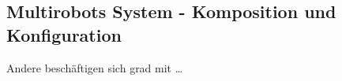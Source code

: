 \subsection{Multirobots System - Komposition und Konfiguration}
\label{sec:relatedwork-multirobots}
    
    Andere beschäftigen sich grad mit \ldots


